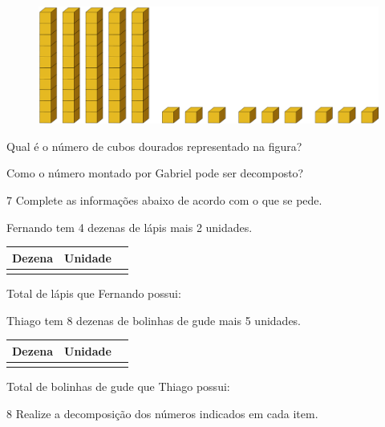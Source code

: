 \begin{figure}[htpb!]
\includegraphics[width=\textwidth]{./media/image3.png}
\end{figure}
\vspace{1.5em}

\begin{escolha}
\item Qual é o número de cubos dourados representado na figura?

\item Como o número montado por Gabriel pode ser decomposto?
\end{escolha}

\num{7} Complete as informações abaixo de acordo com o que se pede. 

\begin{escolha}
\item
  Fernando tem 4 dezenas de lápis mais 2 unidades.

\begin{longtable}[]{@{}lll@{}}
\toprule
\textbf{Dezena} & \textbf{Unidade}\tabularnewline
\midrule
\endhead
&\tabularnewline
\bottomrule
\end{longtable}


Total de lápis que Fernando possui:

\item Thiago tem 8 dezenas de bolinhas de gude mais 5 unidades.

\begin{longtable}[]{@{}lll@{}}
\toprule
\textbf{Dezena} & \textbf{Unidade}\tabularnewline
\midrule
\endhead
&\tabularnewline
\bottomrule
\end{longtable}

Total de bolinhas de gude que Thiago possui:
\end{escolha}

\num{8} Realize a decomposição dos números indicados em cada item.

